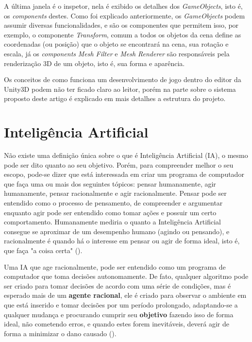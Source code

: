 A última janela é o inspetor, nela é exibido os detalhes dos \textit{GameObjects}, isto é, os \textit{components} destes. Como foi explicado anteriormente, os \textit{GameObjects} podem assumir diversas funcionalidades, e são os componentes que permitem isso, por exemplo, o componente \textit{Transform}, comum a todos os objetos da cena define as coordenadas (ou posição) que o objeto se encontrará na cena, sua rotação e escala, já os \textit{components} \textit{Mesh Filter} e \textit{Mesh Renderer} são responsáveis pela renderização 3D de um objeto, isto é, sua forma e aparência.

Os conceitos de como funciona um desenvolvimento de jogo dentro do editor da Unity3D podem não ter ficado claro ao leitor, porém na parte sobre o sistema proposto deste artigo é explicado em mais detalhes a estrutura do projeto.

\section{Inteligência Artificial}
Não existe uma definição única sobre o que é Inteligência Artificial (IA), o mesmo pode ser dito quanto ao seu objetivo. Porém, para compreender melhor o seu escopo, pode-se dizer que está interessada em criar um programa de computador que faça uma ou mais dos seguintes tópicos: pensar humanamente, agir humanamente, pensar racionalmente e agir racionalmente. Pensar pode ser entendido como o processo de pensamento, de compreender e argumentar enquanto agir pode ser entendido como tomar ações e possuir um certo comportamento. Humanamente mediria o quanto a Inteligência Artificial consegue se aproximar de um desempenho humano (agindo ou pensando), e racionalmente é quando há o interesse em pensar ou agir de forma ideal, isto é, que faça "a coisa certa" ().

Uma IA que age racionalmente, pode ser entendido como um programa de computador que toma decisões autonomamente. De fato, qualquer algoritmo pode ser criado para tomar decisões de acordo com uma série de condições, mas é esperado mais de um \textbf{agente racional}, ele é criado para observar o ambiente em que está inserido e tomar decisões por um período prolongado, adaptando-se a qualquer mudança e procurando cumprir seu \textbf{objetivo} fazendo isso de forma ideal, não cometendo erros, e quando estes forem inevitáveis, deverá agir de forma a minimizar o dano causado ().

